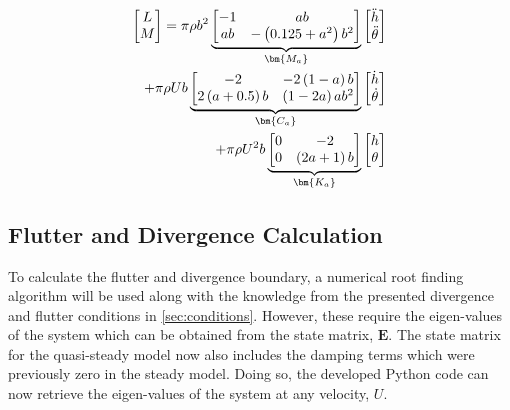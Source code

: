 \begin{align}
    \label{eq:qs_theo}
    \begin{bmatrix}
        L \\ M
    \end{bmatrix} =
    \pi \rho b^2 \underbrace{\begin{bmatrix}
        -1 & ab \\
        ab & -\left(0.125 + a^2\right)b^2
    \end{bmatrix}}_{\bm{M_a}}
    &\begin{bmatrix}
        \ddot{h} \\ \ddot{\theta}
    \end{bmatrix} \\ \notag
    + \pi \rho U b \underbrace{\begin{bmatrix}
        -2 & -2\left(1 - a\right)b \\
        2\left(a + 0.5\right)b & \left(1 - 2a\right)ab^2
    \end{bmatrix}}_{\bm{C_a}}
    &\begin{bmatrix}
        \dot{h} \\ \dot{\theta}
    \end{bmatrix} \\ \notag
    + \pi \rho U^2 b \underbrace{\begin{bmatrix}
        0 & - 2 \\
        0 & \left(2a + 1\right)b
    \end{bmatrix}}_{\bm{K_a}}
    &\begin{bmatrix}
        h \\ \theta
    \end{bmatrix}
\end{align}

\subsection{Flutter and Divergence Calculation}
To calculate the flutter and divergence boundary, a numerical root finding
algorithm will be used along with the knowledge from the presented divergence
and flutter conditions in \cref{sec:conditions}. However, these require the
eigen-values of the system which can be obtained from the state matrix,
$\bm{E}$. The state matrix for the quasi-steady model now also includes the
damping terms which were previously zero in the steady model. Doing so, the
developed Python code can now retrieve the eigen-values of the system at any
velocity, $U$.\\

